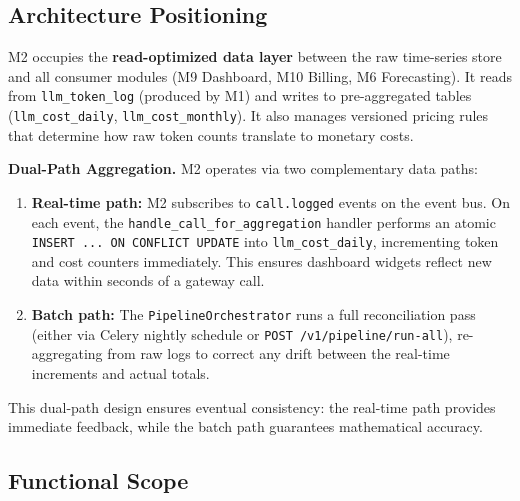 \documentclass[12pt,a4paper,twoside]{report}
\begin{document}
\subsection{Architecture Positioning}
M2 occupies the \textbf{read-optimized data layer} between the raw time-series store and all consumer modules (M9 Dashboard, M10 Billing, M6 Forecasting). It reads from \texttt{llm\_token\_log} (produced by M1) and writes to pre-aggregated tables (\texttt{llm\_cost\_daily}, \texttt{llm\_cost\_monthly}). It also manages versioned pricing rules that determine how raw token counts translate to monetary costs.

\textbf{Dual-Path Aggregation.} M2 operates via two complementary data paths:
\begin{enumerate}
  \item \textbf{Real-time path:} M2 subscribes to \texttt{call.logged} events on the event bus. On each event, the \texttt{handle\_call\_for\_aggregation} handler performs an atomic \texttt{INSERT ... ON CONFLICT UPDATE} into \texttt{llm\_cost\_daily}, incrementing token and cost counters immediately. This ensures dashboard widgets reflect new data within seconds of a gateway call.
  \item \textbf{Batch path:} The \texttt{PipelineOrchestrator} runs a full reconciliation pass (either via Celery nightly schedule or \texttt{POST /v1/pipeline/run-all}), re-aggregating from raw logs to correct any drift between the real-time increments and actual totals.
\end{enumerate}

This dual-path design ensures eventual consistency: the real-time path provides immediate feedback, while the batch path guarantees mathematical accuracy.

\subsection{Functional Scope}
\end{document}
